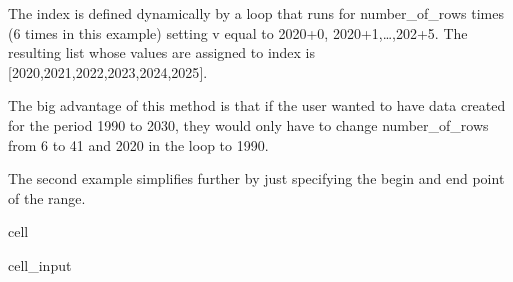 \documentclass[letterpaper,10pt,english]{jupyterBook}
\begin{document}
\sphinxAtStartPar
The index is defined dynamically by a loop  that runs for number\_of\_rows times (6 times in this example) setting v equal to 2020+0, 2020+1,…,202+5. The resulting list whose values are assigned to index is {[}2020,2021,2022,2023,2024,2025{]}.

\sphinxAtStartPar
The big advantage of this method is that if the user wanted to have data created for the period 1990 to 2030, they would only have to change number\_of\_rows from 6 to 41 and 2020 in the loop to 1990.

\sphinxAtStartPar
The second example simplifies further by just specifying the begin and end point of the range.

\begin{sphinxuseclass}{cell}\begin{sphinxVerbatimInput}

\begin{sphinxuseclass}{cell_input}
\begin{sphinxVerbatim}[commandchars=\\\{\}]
   

  
       \PYG{p}{[}    \PYG{p}{]} 
       \PYG{p}{[}\PYG{p}{]}                                 

  
       \PYG{p}{[}    \PYG{p}{]} 
       \PYG{p}{[}\PYG{p}{]}                                 
\end{sphinxVerbatim}


\end{sphinxuseclass}
\end{sphinxVerbatimInput}
\end{sphinxuseclass}
\end{document}
